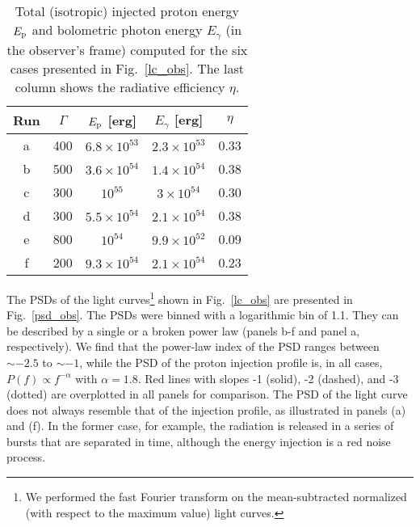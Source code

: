 \documentclass[fleqn,usenatbib]{mnras}
\begin{document}
{\begin{table}
\centering
\caption{Total (isotropic) injected proton energy $E_{\rm p}$ and bolometric photon energy $E_{\gamma}$ (in the observer's frame) computed for the six cases presented in Fig.~\ref{lc_obs}. The last column shows the radiative efficiency $\eta$.}
\label{tab:eff}
\begin{tabular} {ccccc}
Run  & $\Gamma$ & $E_{\rm p}$ [erg] & $E_\gamma$ [erg] & $\eta$ \\
\hline
 a  & 400 & $6.8\times 10^{53}$ & $2.3 \times 10^{53}$ & 0.33 \\
 b & 500 & $3.6 \times 10^{54}$ & $1.4 \times 10^{54}$ & 0.38 \\
 c & 300 & $10^{55}$ & $3\times10^{54}$ & 0.30\\
 d & 300 & $5.5\times 10^{54}$ & $2.1\times 10^{54}$ & 0.38 \\
 e & 800 & $10^{54}$ & $9.9\times 10^{52}$ & 0.09 \\
 f & 200 & $9.3\times10^{54}$ & $2.1\times10^{54}$ & 0.23 \\
 \hline
\end{tabular}
\end{table}

The PSDs of the light curves\footnote{We performed the fast Fourier transform on the mean-subtracted normalized (with respect to the maximum value) light curves.} shown in Fig.~\ref{lc_obs} are presented in Fig.~\ref{psd_obs}. The PSDs were binned with a logarithmic bin of 1.1. They can be described by a single or a broken power law (panels b-f and panel a, respectively). We find that the power-law index of the PSD ranges between $\sim -2.5$ to $\sim -1$, while 
the PSD of the proton injection profile is, in all cases, $P(f) \propto f^{-\alpha}$ with $\alpha=1.8$. Red lines with slopes -1 (solid), -2 (dashed), and -3 (dotted) are overplotted in all panels for comparison. The PSD of the light curve does not always resemble that of the injection profile, as illustrated in panels (a) and (f). In the former case, for example, the radiation is released in a series of bursts that are separated in time, although the energy injection is a red noise process. 

}
\end{document}
